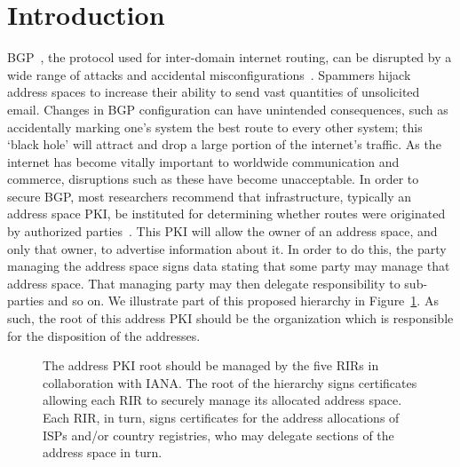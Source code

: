 \section{Introduction}
\label{sec:intro}

BGP~\cite{bgp}, the protocol used for inter-domain internet routing,
can be disrupted by a wide range of attacks and accidental
misconfigurations~\cite{s-bgp1,s-bgp3,threat}. Spammers hijack address spaces to increase their ability to send vast quantities of unsolicited email. Changes in BGP configuration can have unintended consequences, such as accidentally marking one's system the best route to every other system; this `black hole' will attract and drop a large portion of the internet's traffic. As the internet has
become vitally important to worldwide communication and commerce,
disruptions such as these have become unacceptable. In order to secure BGP, most
researchers recommend that infrastructure, typically an address space
PKI, be instituted for determining whether routes were originated by
authorized parties~\cite{s-bgp1,s-bgp2,sobgp,psbgp,spv}. This PKI will
allow the owner of an address space, and only that owner, to advertise
information about it. In order to do this, the party managing the
address space signs data stating that some party may manage that
address space. That managing party may then delegate responsibility to
sub-parties and so on. We illustrate part of this proposed hierarchy
in Figure~\ref{fig:hierarchy}. As such, the root of this address PKI
should be the organization which is responsible for the disposition of
the addresses.

\begin{figure}
\begin{center}
\end{center}
\caption{\small The address PKI root should be managed by the five RIRs in collaboration with IANA. The root of the hierarchy signs certificates allowing each RIR to securely manage its allocated address space. Each RIR, in turn, signs certificates for the address allocations of  ISPs and/or country registries, who may delegate sections of the address space in turn.}
\label{fig:hierarchy}
\end{figure}

